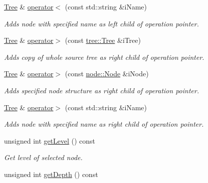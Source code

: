 \begin{DoxyCompactItemize}
\hyperlink{classtree_1_1Tree}{Tree} \& \hyperlink{classtree_1_1Tree_a9197395651b7b6098ffd2eeb62c39263}{operator$<$} (const std\-::string \&i\-Name)
\begin{DoxyCompactList}\small\item\em Adds node with specified name as left child of operation pointer. \end{DoxyCompactList}\item 
\hyperlink{classtree_1_1Tree}{Tree} \& \hyperlink{classtree_1_1Tree_aaffe009efda5ae4b6699890e9c1a7c30}{operator$>$} (const \hyperlink{classtree_1_1Tree}{tree\-::\-Tree} \&i\-Tree)
\begin{DoxyCompactList}\small\item\em Adds {\itshape copy} of whole source tree as right child of operation pointer. \end{DoxyCompactList}\item 
\hyperlink{classtree_1_1Tree}{Tree} \& \hyperlink{classtree_1_1Tree_ae058874c4bd591e2cb060806d6e9de41}{operator$>$} (const \hyperlink{classnode_1_1Node}{node\-::\-Node} \&i\-Node)
\begin{DoxyCompactList}\small\item\em Adds specified node structure as right child of operation pointer. \end{DoxyCompactList}\item 
\hyperlink{classtree_1_1Tree}{Tree} \& \hyperlink{classtree_1_1Tree_a438deea3b585e9f003d21c342e8ad4b1}{operator$>$} (const std\-::string \&i\-Name)
\begin{DoxyCompactList}\small\item\em Adds node with specified name as right child of operation pointer. \end{DoxyCompactList}\item 
\hypertarget{classtree_1_1Tree_a4ddf2644182f9fb72aea10cd42e27926}{unsigned int \hyperlink{classtree_1_1Tree_a4ddf2644182f9fb72aea10cd42e27926}{get\-Level} () const }\label{classtree_1_1Tree_a4ddf2644182f9fb72aea10cd42e27926}

\begin{DoxyCompactList}\small\item\em Get level of selected node. \end{DoxyCompactList}\item 
\hypertarget{classtree_1_1Tree_a88fbf6974cbb144273fffb8289599978}{unsigned int \hyperlink{classtree_1_1Tree_a88fbf6974cbb144273fffb8289599978}{get\-Depth} () const }\label{classtree_1_1Tree_a88fbf6974cbb144273fffb8289599978}


\end{DoxyCompactItemize}
